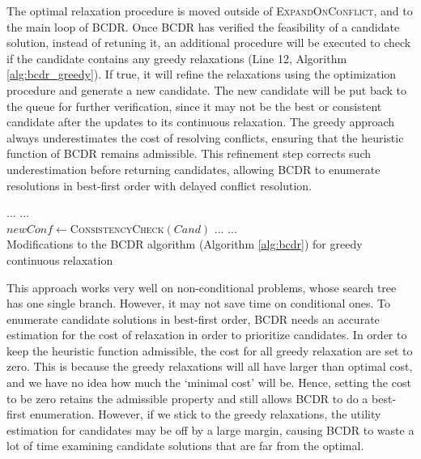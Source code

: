 \documentclass[jair,twoside,11pt,theapa]{article}
\let\oldnl\nl%
\newcommand{\nonl}{\renewcommand{\nl}{\let\nl\oldnl}}%
\begin{document}
The optimal relaxation procedure is moved outside of \textsc{ExpandOnConflict}, and to the main loop of BCDR. Once BCDR has verified
the feasibility of a candidate solution, instead of retuning it, an additional
procedure will be executed to check if the candidate contains any greedy
relaxations (Line 12, Algorithm \ref{alg:bcdr_greedy}). If true, it will refine
the relaxations using the optimization procedure and generate a new candidate.
The new candidate will be put back to the queue for further verification, since
it may not be the best or consistent candidate after the updates to its
continuous relaxation. The greedy approach always underestimates the cost of resolving conflicts, ensuring that the heuristic function of BCDR remains admissible. This refinement step corrects such underestimation before returning candidates,  allowing BCDR to enumerate resolutions in best-first order with delayed conflict resolution.



\begin{algorithm}[htb!]
\setcounter{AlgoLine}{9}
\nonl ... ...\\
$\mathit{newConf}\leftarrow$\textsc{ConsistencyCheck}$(\mathit{Cand})$\;
\nonl ... ... \\
\caption{Modifications to the BCDR algorithm (Algorithm \ref{alg:bcdr}) for greedy continuous relaxation}
\label{alg:bcdr_greedy}
\end{algorithm}



This approach works very well on non-conditional problems, whose search tree has
one single branch. However, it may not save time on conditional ones. To enumerate candidate solutions in best-first order, BCDR needs an
accurate estimation for the cost of relaxation in order to prioritize
candidates. In order to keep the heuristic function admissible, the cost for all
greedy relaxation are set to zero. This is because the greedy relaxations will
all have larger than optimal cost, and we have no idea how much the `minimal cost'
will be. Hence, setting the cost to be zero retains the admissible property and
still allows BCDR to do a best-first enumeration. However, if we stick to the
greedy relaxations, the utility estimation for candidates may be off by a large
margin, causing BCDR to waste a lot of time examining candidate solutions that
are far from the optimal.
\end{document}
